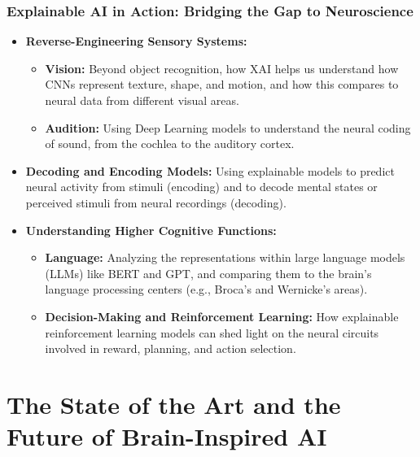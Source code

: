 \documentclass[11pt,a4paper]{article}
\begin{document}
\section{Explainable AI in Action: Bridging the Gap to Neuroscience}
\begin{itemize}
    \item \textbf{Reverse-Engineering Sensory Systems:}
        \begin{itemize}
            \item \textbf{Vision:} Beyond object recognition, how XAI helps us understand how CNNs represent texture, shape, and motion, and how this compares to neural data from different visual areas.
            \item \textbf{Audition:} Using Deep Learning models to understand the neural coding of sound, from the cochlea to the auditory cortex.
        \end{itemize}
    \item \textbf{Decoding and Encoding Models:} Using explainable models to predict neural activity from stimuli (encoding) and to decode mental states or perceived stimuli from neural recordings (decoding).
    \item \textbf{Understanding Higher Cognitive Functions:}
        \begin{itemize}
            \item \textbf{Language:} Analyzing the representations within large language models (LLMs) like BERT and GPT, and comparing them to the brain's language processing centers (e.g., Broca's and Wernicke's areas).
            \item \textbf{Decision-Making and Reinforcement Learning:} How explainable reinforcement learning models can shed light on the neural circuits involved in reward, planning, and action selection.
        \end{itemize}
\end{itemize}

\clearpage

\part{The State of the Art and the Future of Brain-Inspired AI}
\end{document}
